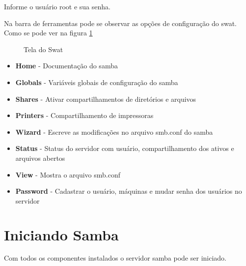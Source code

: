 Informe o usuário root e sua senha.

Na barra de ferramentas pode se observar as opções de configuração do swat. Como se pode ver na figura \ref{swat}

\begin{figure}[ht]
   	\centering
   	\caption{Tela do Swat}
    \label{swat}
\end{figure}

\begin{itemize}
    \item \textbf{Home} - Documentação do samba
    \item \textbf{Globals} - Variáveis globais de configuração do samba
    \item \textbf{Shares} - Ativar compartilhamentos de diretórios e arquivos
    \item \textbf{Printers} - Compartilhamento de impressoras
    \item \textbf{Wizard} - Escreve as modificações no arquivo smb.conf do samba
    \item \textbf{Status} - Status do servidor com usuário, compartilhamento dos ativos e arquivos abertos
    \item \textbf{View} - Mostra o arquivo smb.conf
    \item \textbf{Password} - Cadastrar o usuário, máquinas e mudar senha dos usuários no servidor
\end{itemize}

\section{Iniciando Samba}

Com todos os componentes instalados o servidor samba pode ser iniciado.


